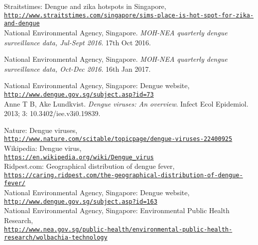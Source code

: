 \documentclass[11pt]{exam}
\begin{document}
\begin{thebibliography}{28}
Straitstimes: Dengue and zika hotspots in Singapore, 
\\\texttt{\url{http://www.straitstimes.com/singapore/sims-place-is-hot-spot-for-zika-and-dengue}}\\
 
National Environmental Agency, Singapore.
\textit{MOH-NEA quarterly dengue surveillance data, Jul-Sept 2016}.
17th Oct 2016.

 
National Environmental Agency, Singapore.
\textit{MOH-NEA quarterly dengue surveillance data, Oct-Dec 2016}.
16th Jan 2017.
 
National Environmental Agency, Singapore: Dengue website,
\\\texttt{\url{http://www.dengue.gov.sg/subject.asp?id=73}}\\

Anne T B, Ake Lundkvist.
\textit{Dengue viruses: An overview}.
Infect Ecol Epidemiol. 2013; 3: 10.3402/iee.v3i0.19839.
 
Nature: Dengue viruses,
\\\texttt{\url{http://www.nature.com/scitable/topicpage/dengue-viruses-22400925}}\\
 
Wikipedia: Dengue virus,
\\\texttt{\url{https://en.wikipedia.org/wiki/Dengue_virus}}\\
 
Ridpest.com: Geographical distribution of dengue fever,
\\\texttt{\url{https://caring.ridpest.com/the-geographical-distribution-of-dengue-fever/}}\\
 
National Environmental Agency, Singapore: Dengue website,
\\\texttt{\url{http://www.dengue.gov.sg/subject.asp?id=163}} \\
 
National Environmental Agency, Singapore: Environmental Public Health Research, 
\\\texttt{\url{http://www.nea.gov.sg/public-health/environmental-public-health-research/wolbachia-technology}} \\
 

\end{thebibliography}
\end{document}
